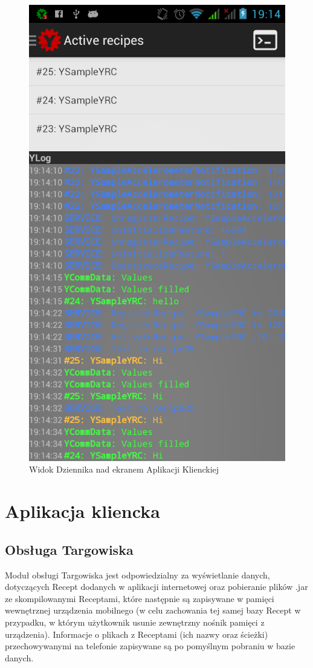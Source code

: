 \documentclass[11pt,a4paper,polish,thesis]{dcsbook}
\begin{document}
\begin{figure}[H]
  \centering
  \includegraphics[scale=0.3]{./resources/logs.png}
  \caption{Widok Dziennika nad ekranem Aplikacji Klienckiej}
  \label{fig:logs}
\end{figure}

\section{Aplikacja kliencka}
\subsection {Obsługa Targowiska}
Moduł obsługi Targowiska jest odpowiedzialny za  wyświetlanie danych, dotyczących Recept dodanych w aplikacji internetowej oraz pobieranie plików .jar ze skompilowanymi Receptami, które następnie są zapisywane w pamięci wewnętrznej urządzenia mobilnego (w celu zachowania tej samej bazy Recept w przypadku, w którym użytkownik usunie zewnętrzny nośnik pamięci z urządzenia). Informacje o plikach z Receptami (ich nazwy oraz ścieżki) przechowywanymi na telefonie zapisywane są po pomyślnym pobraniu w  bazie danych.
\end{document}
